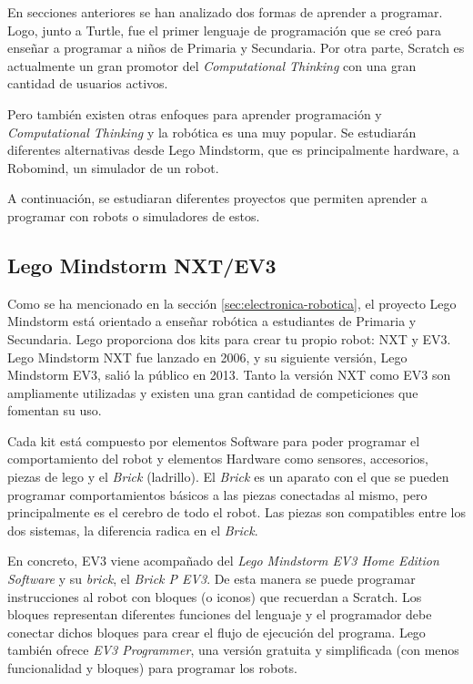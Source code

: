 En secciones anteriores se han analizado dos formas de aprender a programar. Logo, junto a Turtle, fue el primer lenguaje de programación que se creó para enseñar a programar a niños de Primaria y Secundaria. Por otra parte, Scratch es actualmente un gran promotor del \emph{Computational Thinking} con una gran cantidad de usuarios activos.


Pero también existen otras enfoques para aprender programación y \emph{Computational Thinking} y la robótica es una muy popular. Se estudiarán diferentes alternativas desde Lego Mindstorm, que es principalmente hardware, a Robomind, un simulador de un robot.

A continuación, se estudiaran diferentes proyectos que permiten aprender a programar con robots o simuladores de estos.


\subsection{Lego Mindstorm NXT/EV3}
\label{sec:lego-nxt-ec3}

Como se ha mencionado en la sección \ref{sec:electronica-robotica}, el proyecto Lego Mindstorm\cite{lego-mindstorm} está orientado a enseñar robótica a estudiantes de Primaria y Secundaria. Lego proporciona dos kits para crear tu propio robot: NXT y EV3. Lego Mindstorm NXT fue lanzado en 2006, y su siguiente versión, Lego Mindstorm EV3, salió la público en 2013. Tanto la versión NXT como EV3 son ampliamente utilizadas y existen una gran cantidad de competiciones que fomentan su uso.

Cada kit está compuesto por elementos Software para poder programar el comportamiento del robot y elementos Hardware como sensores, accesorios, piezas de lego y el \emph{Brick} (ladrillo). El \emph{Brick} es un aparato con el que se pueden programar comportamientos básicos a las piezas conectadas al mismo, pero principalmente es el cerebro de todo el robot. Las piezas son compatibles entre los dos sistemas, la diferencia radica en el \emph{Brick}. 

En concreto, EV3 viene acompañado del \emph{Lego Mindstorm EV3 Home Edition Software} y su \emph{brick}, el \emph{Brick P EV3}. De esta manera se puede programar instrucciones al robot con bloques (o iconos) que recuerdan a Scratch. Los bloques representan diferentes funciones del lenguaje y el programador debe conectar dichos bloques para crear el flujo de ejecución del programa. Lego también ofrece \emph{EV3 Programmer}, una versión gratuita y simplificada (con menos funcionalidad y bloques) para programar los robots.

